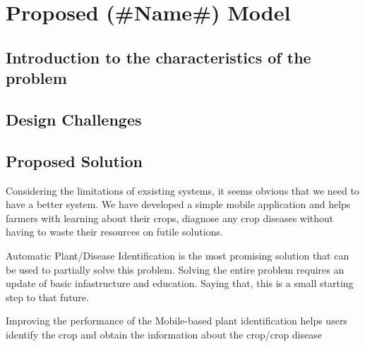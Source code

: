 \documentclass[../Report.tex]{subfiles}
\begin{document}
\chapter{Proposed (\#Name\#) Model}

\section{Introduction to the characteristics of the problem}

\section{Design Challenges}

\section{Proposed Solution}
Considering the limitations of exsisting systems, it seems obvious that we need to have a better system. We have developed a simple 
mobile application and helps farmers with learning about their crops, diagnose any crop diseases without having to waste their resources
on futile solutions.\par
Automatic Plant/Disease Identification is the most promising solution that can be used to partially solve this problem. Solving the entire
problem requires an update of basic infastructure and education. Saying that, this is a small starting step to that future.\par
Improving the performance of the Mobile-based plant identification helps users identify the crop and obtain the information about the 
crop/crop disease\par
\end{document}
